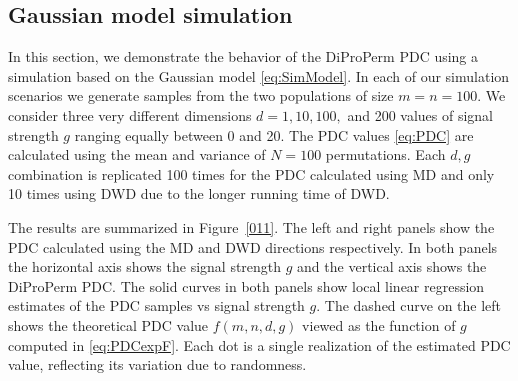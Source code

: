 \documentclass[12pt]{article}
\begin{document}
{
\subsection{Gaussian model simulation}
\label{Gaussian model simulation}
In this section, we demonstrate the behavior of the DiProPerm PDC using a simulation based on the Gaussian model \eqref{eq:SimModel}.  
In each of our simulation scenarios we generate samples from the two populations of size $m=n=100$. We consider three very different dimensions $d=1,10,100,$ and 200 values of signal strength $g$ ranging equally between 0 and 20. The PDC values \eqref{eq:PDC} are calculated using the mean and variance of $N=100$ permutations. Each $d,g$ combination is replicated 100 times for the PDC calculated using MD and only 10 times using DWD due to the longer running time of DWD.

The results are summarized in Figure~\ref{011}. The left and right panels show the PDC calculated using the MD and DWD directions respectively. In both panels the horizontal axis shows the signal strength $g$ and the vertical axis shows the DiProPerm PDC. The solid curves in both panels show local linear regression  estimates \citep{FanGijbels1996} of the PDC samples vs signal strength $g$. The dashed curve on the left shows the theoretical PDC value $f(m,n,d,g)$ viewed as the function of $g$ computed in \eqref{eq:PDCexpF}.
Each dot is a single realization of the estimated PDC value, reflecting its variation due to randomness. 

}
\end{document}
